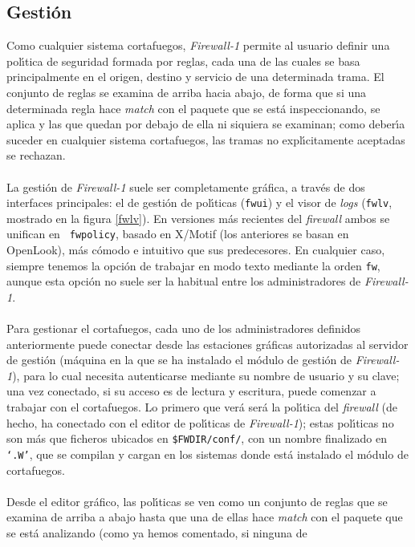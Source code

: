 \subsection{Gesti\'on}
Como cualquier sistema cortafuegos, {\it Firewall-1} permite al usuario definir
una pol\'{\i}tica de seguridad formada por reglas, cada una de las cuales se 
basa principalmente en el origen, destino y servicio de una determinada trama. 
El conjunto de reglas se examina de arriba hacia abajo, de forma que si una 
determinada regla hace {\it match} con el paquete que se est\'a inspeccionando,
se aplica y las que quedan por debajo de ella ni siquiera se examinan; como
deber\'{\i}a suceder en cualquier sistema cortafuegos, las tramas no 
expl\'{\i}citamente aceptadas se rechazan.\\
\\La gesti\'on de {\it Firewall-1} suele ser completamente gr\'afica, a trav\'es
de dos interfaces principales: el de gesti\'on de pol\'{\i}ticas ({\tt fwui}) y 
el visor de {\it logs} ({\tt fwlv}, mostrado en la figura \ref{fwlv}). En 
versiones m\'as recientes del {\it firewall} ambos se unifican en {\tt 
fwpolicy}, basado en X/Motif (los anteriores se basan en OpenLook), m\'as 
c\'omodo e intuitivo que sus predecesores. En cualquier caso, siempre tenemos la
opci\'on de trabajar en modo texto mediante la orden {\tt fw}, aunque esta
opci\'on no suele ser la habitual entre los administradores de {\it 
Firewall-1}.\\
\\Para gestionar el cortafuegos, cada uno de los administradores definidos 
anteriormente puede conectar desde las estaciones gr\'aficas autorizadas al 
servidor de gesti\'on (m\'aquina en la que se ha instalado el m\'odulo de 
gesti\'on de {\it Firewall-1}), para lo cual necesita autenticarse mediante su 
nombre de usuario y su clave; una vez conectado, si su acceso es de lectura y 
escritura, puede comenzar a trabajar con el cortafuegos. Lo primero que ver\'a 
ser\'a la pol\'{\i}tica del {\it firewall} (de hecho, ha conectado con el 
editor de pol\'{\i}ticas de {\it Firewall-1}); estas pol\'{\i}ticas no son m\'as
que ficheros ubicados en {\tt \$FWDIR/conf/}, con un nombre finalizado en {\tt
`.W'}, que se compilan y cargan en los sistemas donde est\'a instalado el 
m\'odulo de cortafuegos.\\
\\Desde el editor gr\'afico, las pol\'{\i}ticas se ven como un conjunto de 
reglas que se examina de arriba a abajo hasta que una de ellas hace {\it match}
con el paquete que se est\'a analizando (como ya hemos comentado, si ninguna de
